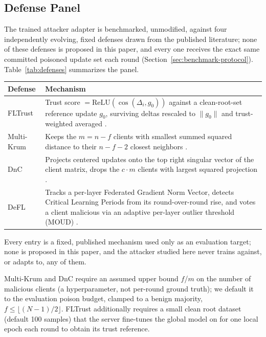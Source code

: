 \documentclass[conference,9pt]{IEEEtran}
\begin{document}
\subsection{Defense Panel}
\label{sec:defense-panel}
The trained attacker adapter is benchmarked, unmodified, against four independently evolving, fixed defenses drawn from the published literature; none of these defenses is proposed in this paper, and every one receives the exact same committed poisoned update set each round (Section~\ref{sec:benchmark-protocol}). Table~\ref{tab:defenses} summarizes the panel.

\begin{center}
\label{tab:defenses}
\small
\begin{tabular}{@{}p{1.5cm}p{6cm}@{}}
\toprule
\textbf{Defense} & \textbf{Mechanism} \\
\midrule
FLTrust & Trust score $= \mathrm{ReLU}(\cos(\Delta_i, g_0))$ against a clean-root-set reference update $g_0$, surviving deltas rescaled to $\|g_0\|$ and trust-weighted averaged \cite{fltrust}. \\
Multi-Krum & Keeps the $m{=}n{-}f$ clients with smallest summed squared distance to their $n{-}f{-}2$ closest neighbors \cite{krum}. \\
DnC & Projects centered updates onto the top right singular vector of the client matrix, drops the $c \cdot m$ clients with largest squared projection \cite{dnc}. \\
DeFL & Tracks a per-layer Federated Gradient Norm Vector, detects Critical Learning Periods from its round-over-round rise, and votes a client malicious via an adaptive per-layer outlier threshold (MOUD) \cite{defl}. \\
\bottomrule
\end{tabular}
\vspace{1mm}

\small Every entry is a fixed, published mechanism used only as an evaluation target; none is proposed in this paper, and the attacker studied here never trains against, or adapts to, any of them.
\end{center}

Multi-Krum and DnC require an assumed upper bound $f$/$m$ on the number of malicious clients (a hyperparameter, not per-round ground truth); we default it to the evaluation poison budget, clamped to a benign majority, $f \le \lfloor (N-1)/2 \rfloor$. FLTrust additionally requires a small clean root dataset (default 100 samples) that the server fine-tunes the global model on for one local epoch each round to obtain its trust reference.
\end{document}
